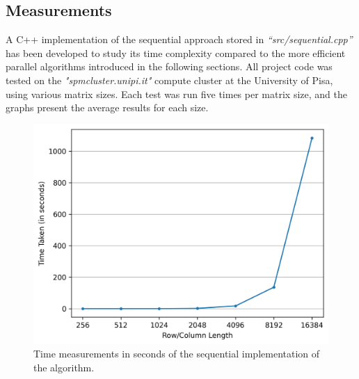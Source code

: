 \subsection*{Measurements}
A C++ implementation of the sequential approach stored in \textit{``src/sequential.cpp''} has been developed to study its time complexity compared to the more efficient parallel algorithms introduced in the following sections. All project code was tested on the \textit{"spmcluster.unipi.it"} compute cluster at the University of Pisa, using various matrix sizes. Each test was run five times per matrix size, and the graphs present the average results for each size.

\begin{figure}[h]
    \centering\includegraphics[scale=0.50]{img/Sequential Implementation/sequential_graph.png}
    \caption{Time measurements in seconds of the sequential implementation of the algorithm.}
\end{figure}

